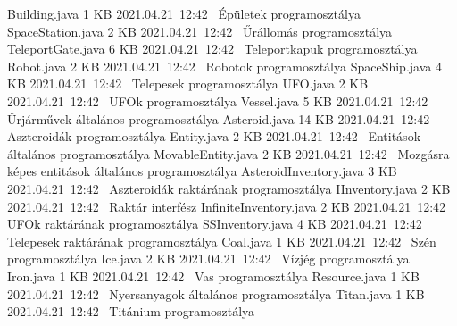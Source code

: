 \documentclass[../../projlab]{subfiles}
\begin{document}
\begin{fajllista}
    \fajl
    {Building.java} %
    {1 KB} %
    {2021.04.21~12:42~} %
    {Épületek programosztálya} %
	\fajl
    {SpaceStation.java} %
    {2 KB} %
    {2021.04.21~12:42~} %
    {Űrállomás programosztálya} %
	\fajl
    {TeleportGate.java} %
    {6 KB} %
    {2021.04.21~12:42~} %
    {Teleportkapuk programosztálya} %
	\fajl
    {Robot.java} %
    {2 KB} %
    {2021.04.21~12:42~} %
    {Robotok programosztálya} %
	\fajl
    {SpaceShip.java} %
    {4 KB} %
    {2021.04.21~12:42~} %
    {Telepesek programosztálya} %
	\fajl
    {UFO.java} %
    {2 KB} %
    {2021.04.21~12:42~} %
    {UFOk programosztálya} %
	\fajl
    {Vessel.java} %
    {5 KB} %
    {2021.04.21~12:42~} %
    {Űrjárművek általános programosztálya} %
	\fajl
    {Asteroid.java} %
    {14 KB} %
    {2021.04.21~12:42~} %
    {Aszteroidák programosztálya} %
	\fajl
    {Entity.java} %
    {2 KB} %
    {2021.04.21~12:42~} %
    {Entitások általános programosztálya} %
	\fajl
    {MovableEntity.java} %
    {2 KB} %
    {2021.04.21~12:42~} %
    {Mozgásra képes entitások általános programosztálya} %
	\fajl
    {AsteroidInventory.java} %
    {3 KB} %
    {2021.04.21~12:42~} %
    {Aszteroidák raktárának programosztálya} %
	\fajl
    {IInventory.java} %
    {2 KB} %
    {2021.04.21~12:42~} %
    {Raktár interfész} %
	\fajl
    {InfiniteInventory.java} %
    {2 KB} %
    {2021.04.21~12:42~} %
    {UFOk raktárának programosztálya} %
	\fajl
    {SSInventory.java} %
    {4 KB} %
    {2021.04.21~12:42~} %
    {Telepesek raktárának programosztálya} %
	\fajl
    {Coal.java} %
    {1 KB} %
    {2021.04.21~12:42~} %
    {Szén programosztálya} %
	\fajl
    {Ice.java} %
    {2 KB} %
    {2021.04.21~12:42~} %
    {Vízjég programosztálya} %
	\fajl
    {Iron.java} %
    {1 KB} %
    {2021.04.21~12:42~} %
    {Vas programosztálya} %
	\fajl
    {Resource.java} %
    {1 KB} %
    {2021.04.21~12:42~} %
    {Nyersanyagok általános programosztálya} %
	\fajl
    {Titan.java} %
    {1 KB} %
    {2021.04.21~12:42~} %
    {Titánium programosztálya} %

\end{fajllista}
\end{document}

